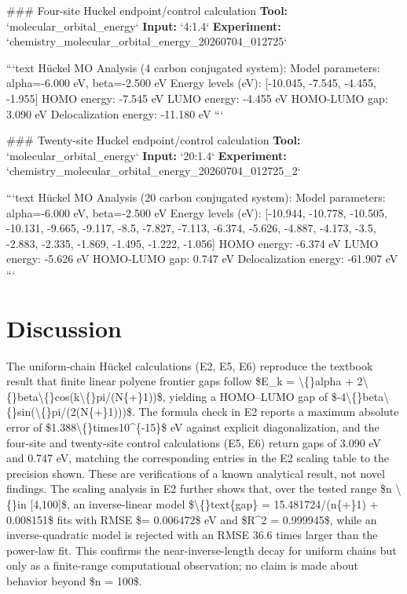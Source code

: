 \documentclass[11pt,a4paper]{article}
\begin{document}
\#\#\# Four-site Huckel endpoint/control calculation
\textbf{Tool:} `molecular\_orbital\_energy`
\textbf{Input:} `4:1.4`
\textbf{Experiment:} `chemistry\_molecular\_orbital\_energy\_20260704\_012725`

```text
Hückel MO Analysis (4 carbon conjugated system):
  Model parameters: alpha=-6.000 eV, beta=-2.500 eV
  Energy levels (eV): [-10.045, -7.545, -4.455, -1.955]
  HOMO energy: -7.545 eV
  LUMO energy: -4.455 eV
  HOMO-LUMO gap: 3.090 eV
  Delocalization energy: -11.180 eV
```

\#\#\# Twenty-site Huckel endpoint/control calculation
\textbf{Tool:} `molecular\_orbital\_energy`
\textbf{Input:} `20:1.4`
\textbf{Experiment:} `chemistry\_molecular\_orbital\_energy\_20260704\_012725\_2`

```text
Hückel MO Analysis (20 carbon conjugated system):
  Model parameters: alpha=-6.000 eV, beta=-2.500 eV
  Energy levels (eV): [-10.944, -10.778, -10.505, -10.131, -9.665, -9.117, -8.5, -7.827, -7.113, -6.374, -5.626, -4.887, -4.173, -3.5, -2.883, -2.335, -1.869, -1.495, -1.222, -1.056]
  HOMO energy: -6.374 eV
  LUMO energy: -5.626 eV
  HOMO-LUMO gap: 0.747 eV
  Delocalization energy: -61.907 eV
```


\section{Discussion}
The uniform-chain Hückel calculations (E2, E5, E6) reproduce the textbook result that finite linear polyene frontier gaps follow \$E\_k = \textbackslash\{\}alpha + 2\textbackslash\{\}beta\textbackslash\{\}cos(k\textbackslash\{\}pi/(N\{+\}1))\$, yielding a HOMO–LUMO gap of \$-4\textbackslash\{\}beta\textbackslash\{\}sin(\textbackslash\{\}pi/(2(N\{+\}1)))\$. The formula check in E2 reports a maximum absolute error of \$1.388\textbackslash\{\}times10\textasciicircum{}\{-15\}\$ eV against explicit diagonalization, and the four-site and twenty-site control calculations (E5, E6) return gaps of 3.090 eV and 0.747 eV, matching the corresponding entries in the E2 scaling table to the precision shown. These are verifications of a known analytical result, not novel findings. The scaling analysis in E2 further shows that, over the tested range \$n \textbackslash\{\}in [4,100]\$, an inverse-linear model \$\textbackslash\{\}text\{gap\} = 15.481724/(n\{+\}1) + 0.008151\$ fits with RMSE \$= 0.006472\$ eV and \$R\textasciicircum{}2 = 0.999945\$, while an inverse-quadratic model is rejected with an RMSE 36.6 times larger than the power-law fit. This confirms the near-inverse-length decay for uniform chains but only as a finite-range computational observation; no claim is made about behavior beyond \$n = 100\$.
\end{document}
